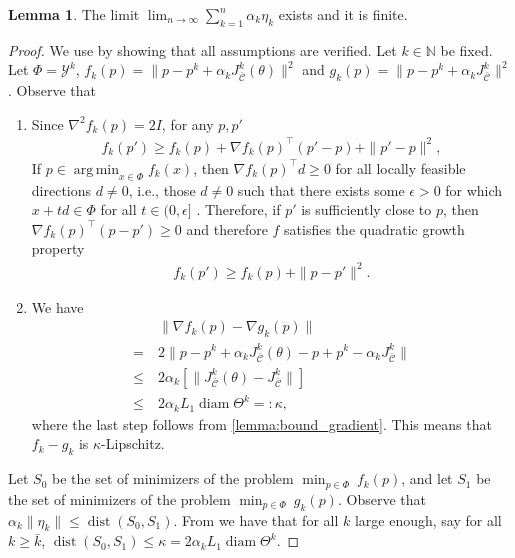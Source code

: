 \documentclass[journal,twoside,web,final]{ieeecolor}
\theoremstyle{definition}
\newtheorem{lemma}{Lemma}
\DeclareMathOperator*{\argmin}{arg\,min}
\newcommand{\N}{\mathbb{N}}
\newcommand{\Cb}{{\bar{\mathcal{C}}}}
\begin{document}
\medskip
\begin{lemma}\label{lemma:first_error_limit}
The limit $\displaystyle \lim_{n \to \infty} \sum_{k=1}^{n} \alpha_k \eta_k$ exists and it is finite.
\end{lemma}
%
\begin{proof}
We use \cite[Proposition 4.32]{bonnans2013perturbation} by showing that all assumptions are verified. Let $k\in\N$ be fixed. Let $\Phi=\mathcal{Y}^k$, $f_k(p)=\|p-p^k+\alpha_k J_\Cb^k(\theta)\|^2$ and $g_k(p)=\|p-p^k+\alpha_k J_\Cb^k\|^2$. Observe that
\begin{enumerate}
    \item Since $\nabla^2 f_k(p)=2I$, for any $p,p'$
    \begin{align*}
    f_k(p') \geq f_k(p) + \nabla f_k(p) ^{\top} (p'-p) + \|p'-p\|^2,
    \end{align*}
    If $p\in\argmin_{x\in\Phi} f_k(x)$, then $\nabla f_k(p) ^{\top} d \geq 0$ for all locally feasible directions $d \neq 0$, i.e., those $d \neq 0$ such that there exists some $\epsilon>0$ for which $x+td\in \Phi$ for all $t\in (0,\epsilon]$ \cite[Theorem 4.9]{bagirov2014introduction}. Therefore, if $p'$ is sufficiently close to $p$, then $\nabla f_k(p)^{\top}(p-p') \geq 0$ and therefore $f$ satisfies the quadratic growth property
    \begin{align*}
    f_k(p') \geq f_k(p) + \|p-p'\|^2.
    \end{align*}
    \item We have
    \begin{align*}
    & \| \nabla f_k(p) - \nabla g_k(p) \| \\
    =~ & 2\| p - p^k + \alpha_k J_\Cb^k(\theta) - p + p^k - \alpha_k J_\Cb^k \| \\
    \leq~ & 2 \alpha_k [ \| J_\Cb^k(\theta)-J_\Cb^k \| ] \\
    \leq~ & 2 \alpha_k L_1 \operatorname*{diam}\Theta^k =: \kappa,
    \end{align*}
    where the last step follows from \cref{lemma:bound_gradient}. This means that $f_k-g_k$ is $\kappa$-Lipschitz.
\end{enumerate}
Let $S_0$ be the set of minimizers of the problem $\min_{p\in \Phi} ~f_k(p)$, and let $S_1$ be the set of minimizers of the problem $\min_{p\in \Phi}~ g_k(p)$. Observe that $\alpha_k \| \eta_k \| \leq \operatorname*{dist} (S_0,S_1) $. From \cite[Proposition 4.32]{bonnans2013perturbation} we have that for all $k$ large enough, say for all $k \geq \bar{k}$, $\operatorname*{dist}(S_0,S_1) \leq \kappa = 2 \alpha_k L_1 \operatorname*{diam}\Theta^k$.

\end{proof}
\end{document}
